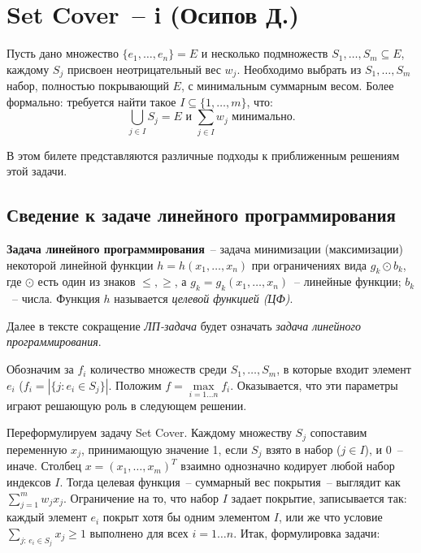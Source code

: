 \hypertarget{setcover}{\section{Set Cover~-- i (Осипов Д.)}}

\begin{problem*}
	Пусть дано множество $\{e_1, \ldots, e_n\} = E$ и несколько подмножеств $S_1, \ldots, S_m \subseteq E$, каждому $S_j$ присвоен неотрицательный вес $w_j$. Необходимо выбрать из $S_1, \ldots, S_m$ набор, полностью покрывающий $E$, с минимальным суммарным весом. Более формально: требуется найти такое $I \subseteq \{1, \ldots, m\}$, что: $$\bigcup_{j\in I} S_j = E \text{ и } \sum_{j \in I} w_j \text{ минимально.}$$
\end{problem*}

В этом билете представляются различные подходы к приближенным решениям этой задачи.

\subsection{Сведение к задаче линейного программирования}

\begin{definition*}
	{\bfseries Задача линейного программирования}~-- задача минимизации (максимизации) некоторой линейной функции $h = h(x_1, \ldots, x_n)$ при ограничениях вида $g_k \odot b_k$, где $\odot$ есть один из знаков $\leq, \geq$, а $g_k = g_k(x_1, \ldots, x_n)$~-- линейные функции; $b_k$~-- числа. Функция $h$ называется \textit{целевой функцией (ЦФ)}.
\end{definition*}

Далее в тексте сокращение \textit{ЛП-задача} будет означать \textit{задача линейного программирования}.

Обозначим за $f_i$ количество множеств среди $S_1, \ldots, S_m$, в которые входит элемент $e_i$ ($f_i = \left|\{j: e_i \in S_j\}\right|$. Положим $f = \max\limits_{i=1\ldots n} f_i$. Оказывается, что эти параметры играют решающую роль в следующем решении.

Переформулируем задачу Set Cover. Каждому множеству $S_j$ сопоставим переменную $x_j$, принимающую значение 1, если $S_j$ взято в набор ($j \in I$), и 0~-- иначе. Столбец $x = (x_1, \ldots, x_m)^T$ взаимно однозначно кодирует любой набор индексов $I$. Тогда целевая функция~-- суммарный вес покрытия~-- выглядит как $\sum\limits_{j=1}^m w_j x_j$. Ограничение на то, что набор $I$ задает покрытие, записывается так: каждый элемент $e_i$ покрыт хотя бы одним элементом $I$, или же что условие $\sum\limits_{j:\, e_i \in S_j} x_j \geq 1$ выполнено для всех $i=1\ldots n$. Итак, формулировка задачи:

